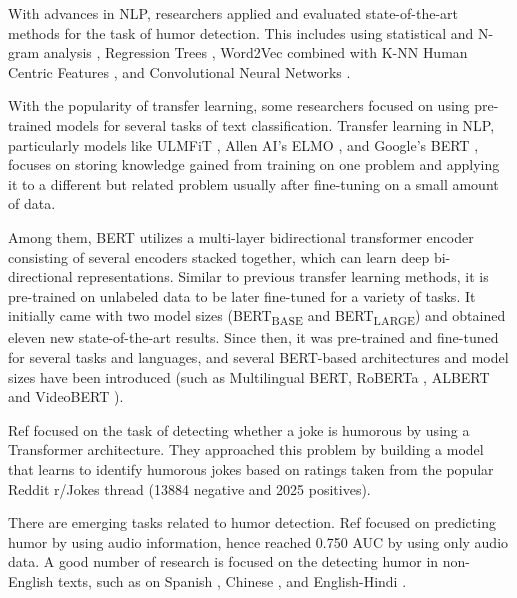 \documentclass[journal]{IEEEtran}
\begin{document}
With advances in NLP, researchers applied and evaluated state-of-the-art methods for the task of humor detection. This includes using statistical and N-gram analysis \cite{taylor2004computationally}, Regression Trees \cite{purandare2006humor}, Word2Vec combined with K-NN Human Centric Features \cite{yang2015humor}, and Convolutional Neural Networks \cite{chen2018humor} \cite{weller2019humor}. 

With the popularity of transfer learning, some researchers focused on using pre-trained models for several tasks of text classification. Transfer learning in NLP, particularly models like ULMFiT \cite{howard2018universal}, Allen AI’s ELMO \cite{peters2018deep}, and Google’s BERT \cite{devlin2018bert}, focuses on storing knowledge gained from training on one problem and applying it to a different but related problem usually after fine-tuning on a small amount of data.





Among them, BERT \cite{devlin2018bert} utilizes a multi-layer bidirectional transformer encoder consisting of several encoders stacked together, which can learn deep bi-directional representations. Similar to previous transfer learning methods, it is pre-trained on unlabeled data to be later fine-tuned for a variety of tasks. It initially came with two model sizes (BERT\textsubscript{BASE} and BERT\textsubscript{LARGE}) and obtained eleven new state-of-the-art results. Since then, it was pre-trained and fine-tuned for several tasks and languages, and several BERT-based architectures and model sizes have been introduced (such as Multilingual BERT, RoBERTa \cite{liu2019roberta}, ALBERT \cite{lan2019albert} and VideoBERT \cite{sun2019videobert}).

Ref \cite{weller2019humor} focused on the task of detecting whether a joke is humorous by using a Transformer architecture. They approached this problem by building a model that learns to identify humorous jokes based on ratings taken from the popular Reddit r/Jokes thread (13884 negative and 2025 positives).

There are emerging tasks related to humor detection. Ref \cite{yang2019predicting} focused on predicting humor by using audio information, hence reached 0.750 AUC by using only audio data. A good number of research is focused on the detecting humor in non-English texts, such as on Spanish \cite{chiruzzo2019overview, ismailov2019humor, giudice2019aspie96}, Chinese \cite{yang2019predicting}, and English-Hindi \cite{khandelwal2018humor}.
\end{document}
